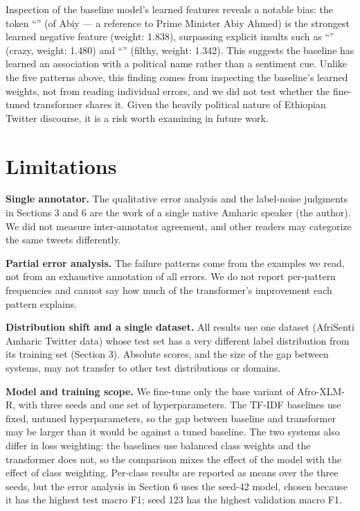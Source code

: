 Inspection of the baseline model's learned features reveals a notable bias: the token ``'' (of Abiy --- a reference to Prime Minister Abiy Ahmed) is the strongest learned negative feature (weight: 1.838), surpassing explicit insults such as ``'' (crazy, weight: 1.480) and ``'' (filthy, weight: 1.342). This suggests the baseline has learned an association with a political name rather than a sentiment cue. Unlike the five patterns above, this finding comes from inspecting the baseline's learned weights, not from reading individual errors, and we did not test whether the fine-tuned transformer shares it. Given the heavily political nature of Ethiopian Twitter discourse, it is a risk worth examining in future work.


\section{Limitations}

\textbf{Single annotator.} The qualitative error analysis and the label-noise judgments in Sections 3 and 6 are the work of a single native Amharic speaker (the author). We did not measure inter-annotator agreement, and other readers may categorize the same tweets differently.

\textbf{Partial error analysis.} The failure patterns come from the examples we read, not from an exhaustive annotation of all errors. We do not report per-pattern frequencies and cannot say how much of the transformer's improvement each pattern explains.

\textbf{Distribution shift and a single dataset.} All results use one dataset (AfriSenti Amharic Twitter data) whose test set has a very different label distribution from its training set (Section 3). Absolute scores, and the size of the gap between systems, may not transfer to other test distributions or domains.

\textbf{Model and training scope.} We fine-tune only the base variant of Afro-XLM-R, with three seeds and one set of hyperparameters. The TF-IDF baselines use fixed, untuned hyperparameters, so the gap between baseline and transformer may be larger than it would be against a tuned baseline. The two systems also differ in loss weighting: the baselines use balanced class weights and the transformer does not, so the comparison mixes the effect of the model with the effect of class weighting. Per-class results are reported as means over the three seeds, but the error analysis in Section 6 uses the seed-42 model, chosen because it has the highest test macro F1; seed 123 has the highest validation macro F1.

